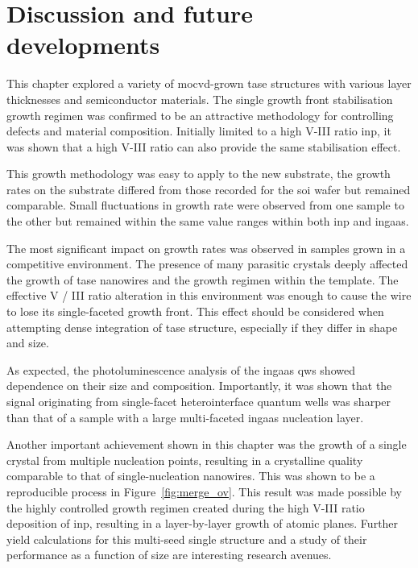 \section{Discussion and future developments}

This chapter explored a variety of \acs{mocvd}-grown \acs{tase} structures with various layer thicknesses and semiconductor materials. The  single growth front stabilisation growth regimen was confirmed to be an attractive methodology for controlling defects and material composition. Initially limited to a high V-III ratio \acs{inp}, it was shown that a high V-III ratio  can also provide the same  stabilisation effect. 

This growth methodology was easy to apply to the new substrate, the growth rates on the  substrate differed from those recorded for the  \acs{soi} wafer but remained comparable. Small fluctuations in growth rate were observed from one sample to the other but remained within the same value ranges within both \acs{inp} and \acs{ingaas}. 

The most significant impact on growth rates was observed in samples grown in a competitive environment. The presence of many parasitic crystals deeply affected the growth of \acs{tase} nanowires and the growth regimen within the template. The effective V / III ratio alteration in this environment was enough to cause the wire to lose its single-faceted growth front. This effect should be considered when attempting dense integration of \acs{tase} structure, especially if they differ in shape and size.

As expected, the photoluminescence analysis of the \acs{ingaas} \acs{qw}s showed dependence on their size and composition. Importantly, it was shown that the signal originating from  single-facet heterointerface quantum wells was sharper than that of a sample with a large multi-faceted \acs{ingaas} nucleation layer.

Another important achievement shown in this chapter was the growth of a single crystal from multiple nucleation points, resulting in a crystalline quality comparable to that of single-nucleation nanowires. This was shown to be a reproducible process in Figure~\ref{fig:merge_ov}. This result was made possible by the highly controlled growth regimen created during the high V-III ratio deposition of \acs{inp}, resulting in a layer-by-layer growth of  atomic planes. Further yield calculations for this multi-seed single structure and a study of their performance as a function of size are interesting research avenues. 

